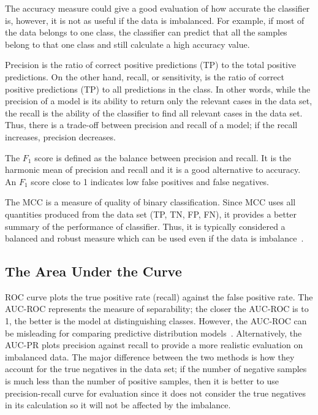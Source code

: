 The accuracy measure could give a good evaluation of how accurate the classifier is, however, it is not as useful if the data is imbalanced.
For example, if most of the data belongs to one class, the classifier can predict that all the samples belong to that one class and still calculate a high accuracy value.

Precision is the ratio of correct positive predictions (TP) to the total positive predictions.
On the other hand, recall, or sensitivity, is the ratio of correct positive predictions (TP) to all predictions in the class.
In other words, while the precision of a model is its ability to return only the relevant cases in the data set, the recall is the ability of the classifier to find all relevant cases in the data set.
Thus, there is a trade-off between precision and recall of a model; if the recall increases, precision decreases.

The $F_{1}$ score is defined as the balance between precision and recall.
It is the harmonic mean of precision and recall and it is a good alternative to accuracy.
An $F_{1}$ score close to 1 indicates low false positives and false negatives.

The \ac{MCC} is a measure of quality of binary classification.
Since \ac{MCC} uses all quantities produced from the data set (TP, TN, FP, FN), it provides a better summary of the performance of classifier.
Thus, it is typically considered a balanced and robust measure which can be used even if the data is imbalance~\cite{boughorbel_optimal_2017}.

\subsection{The Area Under the Curve}

\ac{ROC} curve plots the true positive rate (recall) against the false positive rate.
The \ac{AUC-ROC} represents the measure of separability; the closer the AUC-ROC is to 1, the better is the model at distinguishing classes.
However, the AUC-ROC can be misleading for comparing predictive distribution models~\cite{lobo_auc:_2008}.
Alternatively, the \ac{AUC-PR} plots precision against recall to provide a more realistic evaluation on imbalanced data.
The major difference between the two methods is how they account for the true negatives in the data set; if the number of negative samples is much less than the number of positive samples, then it is better to use precision-recall curve for evaluation since it does not consider the true negatives in its calculation so it will not be affected by the imbalance.
